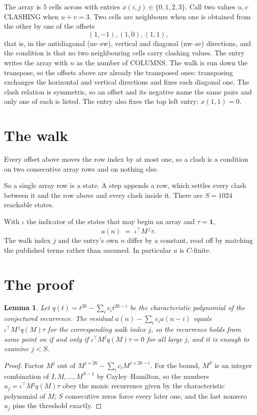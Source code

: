 \documentclass[11pt,a4paper]{article}
\theoremstyle{plain}
\newtheorem{lemma}[theorem]{Lemma}
\theoremstyle{definition}
\begin{document}
The array is $5$ cells across with entries $x(i,j)\in\{0,1,2,3\}$. Call two values $u,v$ CLASHING
when $u+v=3$. Two cells are neighbours when one is obtained from the other by one of
the offsets
\[
(1,-1), (1,0), (1,1),
\]
that is, in the antidiagonal (ne--sw), vertical and diagonal (nw--se) directions, and the condition is that no two neighbouring cells carry
clashing values. The entry writes the array with $n$ as the number of COLUMNS. The walk is run down the transpose, so the offsets above are already the transposed ones: transposing exchanges the horizontal and vertical directions and fixes each diagonal one. The clash relation is symmetric, so an offset and its negative name the
same pairs and only one of each is listed. The entry also fixes the top left entry: $x(1,1)=0$.

\section{The walk}

Every offset above moves the row index by at most one, so a clash is a condition on two
consecutive array rows and on nothing else.

So a single array row is a state. A step appends a row, which settles every clash between it
and the row above and every clash inside it. There are $S=1024$ reachable states.

With $\iota$ the indicator of the states that may begin an array and $\tau=\mathbf{1}$,
\[
a(n)\;=\;\iota^{\!\top}M^{\,j}\tau .
\]
The walk index $j$ and the entry's own $n$ differ by a constant, read off by matching the
published terms rather than assumed. In particular $a$ is $C$-finite.

\section{The proof}

\begin{lemma}\label{lem:crit}
Let $q(t)=t^{26}-\sum_i c_it^{26-i}$ be the characteristic polynomial of the
conjectured recurrence. The residual $a(n)-\sum_ic_ia(n-i)$ equals
$\iota^{\!\top}M^{\,j}q(M)\tau$ for the corresponding walk index $j$, so the recurrence
holds from some point on if and only if $\iota^{\!\top}M^{j}q(M)\tau=0$ for all large $j$,
and it is enough to examine $j<S$.
\end{lemma}

\begin{proof}
Factor $M^{j}$ out of $M^{j+26}-\sum_ic_iM^{j+26-i}$. For the bound, $M^{S}$
is an integer combination of $I,M,\dots,M^{S-1}$ by Cayley--Hamilton, so the numbers
$u_j=\iota^{\!\top}M^{j}q(M)\tau$ obey the monic recurrence given by the characteristic
polynomial of $M$; $S$ consecutive zeros force every later one, and the last nonzero $u_j$
pins the threshold exactly.
\end{proof}
\end{document}
